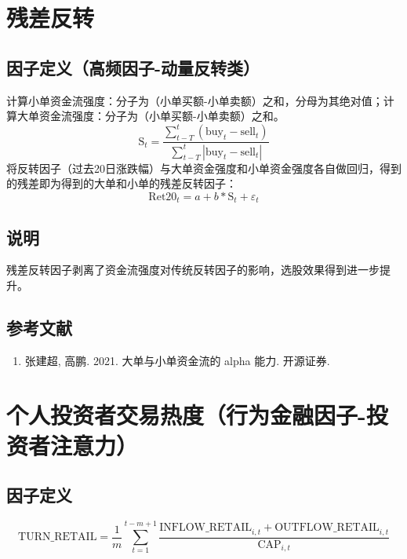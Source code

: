\documentclass{article}
\begin{document}
\section{残差反转}

\subsection{因子定义（高频因子-动量反转类）}

计算小单资金流强度：分子为（小单买额-小单卖额）之和，分母为其绝对值；计算大单资金流强度：分子为（小单买额-小单卖额）之和。
\begin{equation}
    \mathrm{S}_t = \frac{\sum_{t-T}^t (\mathrm{buy}_t - \mathrm{sell}_t)}{\sum_{t-T}^t |\mathrm{buy}_t - \mathrm{sell}_t|}
\end{equation}
将反转因子（过去20日涨跌幅）与大单资金强度和小单资金强度各自做回归，得到的残差即为得到的大单和小单的残差反转因子：
\begin{equation}
    \mathrm{Ret20}_t = a + b * \mathrm{S}_t + \varepsilon_t
\end{equation}

\subsection{说明}
残差反转因子剥离了资金流强度对传统反转因子的影响，选股效果得到进一步提升。

\subsection{参考文献}
\begin{enumerate}
    \item 张建超, 高鹏. 2021. 大单与小单资金流的 alpha 能力. 开源证券.
\end{enumerate}

\section{个人投资者交易热度（行为金融因子-投资者注意力）}

\subsection{因子定义}

\begin{equation}
    \mathrm{TURN\_RETAIL} = \frac{1}{m} \sum_{t=1}^{t-m+1} \frac{\mathrm{INFLOW\_RETAIL}_{i,t} + \mathrm{OUTFLOW\_RETAIL}_{i,t}}{\mathrm{CAP}_{i,t}}
\end{equation}
\end{document}

